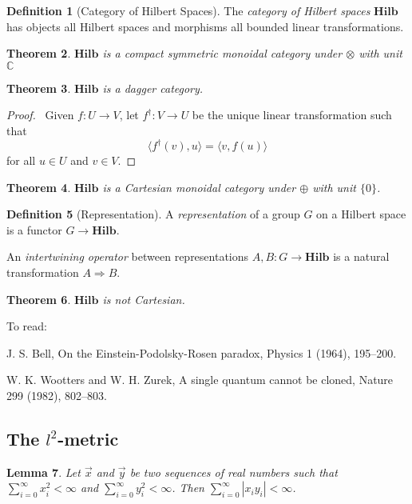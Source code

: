 \documentclass{book}
\newtheorem{lm}{Lemma}[chapter]
\newtheorem{thm}[lm]{Theorem}
\theoremstyle{definition}
\newtheorem{df}[lm]{Definition}
\begin{document}
\begin{df}[Category of Hilbert Spaces]
  The \emph{category of Hilbert spaces} $\mathbf{Hilb}$ has objects all Hilbert
spaces and morphisms all bounded linear transformations.
\end{df}

\begin{thm}
$\mathbf{Hilb}$ is a compact symmetric monoidal category under $\otimes$ with 
unit $\mathbb{C}$
\end{thm}

\begin{thm}
$\mathbf{Hilb}$ is a dagger category.
\end{thm}

\begin{proof}
\pf\ Given $f : U \rightarrow V$, let $f^\dagger : V \rightarrow U$ be the 
unique linear transformation such that
\[ \langle f^\dagger(v), u \rangle = \langle v, f(u) \rangle \]
for all $u \in U$ and $v \in V$.
\end{proof}

\begin{thm}
$\mathbf{Hilb}$ is a Cartesian monoidal category under $\oplus$ with unit 
$\{0\}$.
\end{thm}

\begin{df}[Representation]
A \emph{representation} of a group $G$ on a Hilbert space is a functor $G 
\rightarrow \mathbf{Hilb}$.

An \emph{intertwining operator} between representations $A, B : G \rightarrow 
\mathbf{Hilb}$ is a natural transformation $A \Rightarrow B$.
\end{df}

\begin{thm}
$\mathbf{Hilb}$ is not Cartesian.
\end{thm}

To read:

J. S. Bell, On the Einstein-Podolsky-Rosen paradox, Physics 1 (1964), 195–200.

W. K. Wootters and W. H. Zurek, A single quantum cannot be cloned, Nature 299 
(1982), 802–803.

\subsection{The $l^2$-metric}

\begin{lm}
Let $\vec{x}$ and $\vec{y}$ be two sequences of real numbers such that 
$\sum_{i=0}^\infty x_i^2 < \infty$ and $\sum_{i=0}^\infty y_i^2 < \infty$. Then
$\sum_{i=0}^\infty |x_i y_i| < \infty$.
\end{lm}
\end{document}
